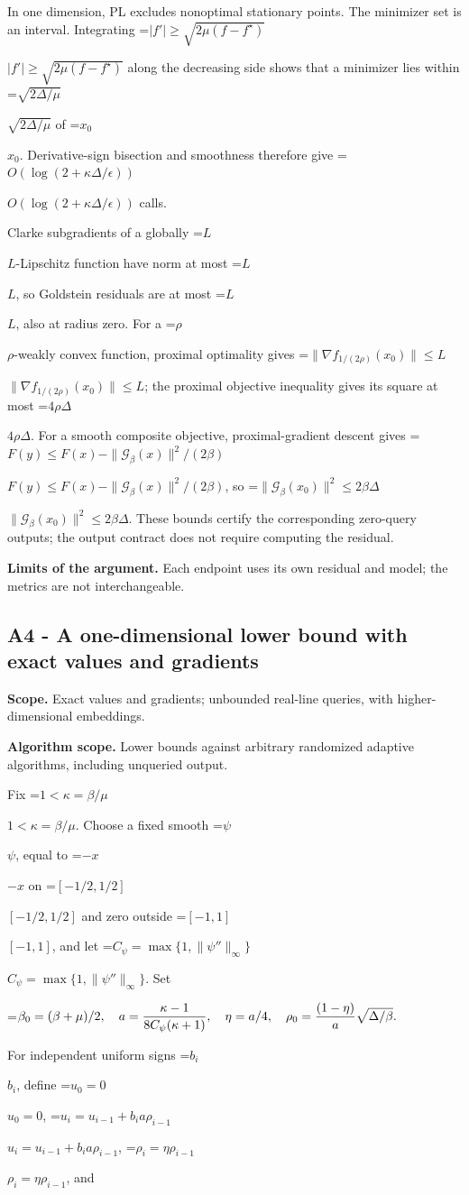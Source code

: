 \documentclass[10pt,a4paper]{article}
\newcommand{\AtlasMath}[1]{\par\begingroup\centering\setbox0=\hbox{$\displaystyle #1$}\ifdim\wd0>1.4\linewidth\typeout{ATLAS WIDE FORMULA: \the\wd0}\fi\ifdim\wd0>\linewidth\resizebox{\linewidth}{!}{\box0}\else\box0\fi\par\endgroup}
\newcommand{\AtlasInlineMath}[1]{\begingroup\setbox0=\hbox{$#1$}\ifdim\wd0>.4\linewidth\endgroup\AtlasMath{#1}\else\endgroup$#1$\fi}
\begin{document}
In one dimension, PL excludes nonoptimal stationary points. The minimizer set is an interval. Integrating
\AtlasInlineMath{|f'|\ge\sqrt{2\mu(f-f^\star)}}
along the decreasing side shows that a minimizer lies within \AtlasInlineMath{\sqrt{2\Delta/\mu}} of \AtlasInlineMath{x_0}. Derivative-sign bisection and smoothness therefore give \AtlasInlineMath{O(\log(2+\kappa\Delta/\epsilon))} calls.

Clarke subgradients of a globally \AtlasInlineMath{L}-Lipschitz function have norm at most \AtlasInlineMath{L}, so Goldstein residuals are at most \AtlasInlineMath{L}, also at radius zero. For a \AtlasInlineMath{\rho}-weakly convex function, proximal optimality gives
\AtlasInlineMath{\|\nabla f_{1/(2\rho)}(x_0)\|\le L}; the proximal objective inequality gives its square at most \AtlasInlineMath{4\rho\Delta}.
For a smooth composite objective, proximal-gradient descent gives
\AtlasInlineMath{F(y)\le F(x)-\|\mathcal G_\beta(x)\|^2/(2\beta)},
so \AtlasInlineMath{\|\mathcal G_\beta(x_0)\|^2\le2\beta\Delta}.
These bounds certify the corresponding zero-query outputs; the output contract does not require computing the residual.

\textbf{Limits of the argument.} Each endpoint uses its own residual and model; the metrics are not interchangeable.

\subsection{A4 - A one-dimensional lower bound with exact values and gradients}
\textbf{Scope.} Exact values and gradients; unbounded real-line queries, with higher-dimensional embeddings.

\textbf{Algorithm scope.} Lower bounds against arbitrary randomized adaptive algorithms, including unqueried output.

Fix \AtlasInlineMath{1<\kappa=\beta/\mu}. Choose a fixed smooth \AtlasInlineMath{\psi}, equal to \AtlasInlineMath{-x} on \AtlasInlineMath{[-1/2,1/2]} and zero outside \AtlasInlineMath{[-1,1]}, and let \AtlasInlineMath{C_\psi=\max\{1,\|\psi''\|_\infty\}}. Set

\AtlasMath{\beta_0=(\beta+\mu)/2,\quad a={\kappa-1\over8C_\psi(\kappa+1)},\quad
\eta=a/4,\quad \rho_0={(1-\eta)\over a}\sqrt{\Delta/\beta}.}

For independent uniform signs \AtlasInlineMath{b_i}, define \AtlasInlineMath{u_0=0},
\AtlasInlineMath{u_i=u_{i-1}+b_i a\rho_{i-1}}, \AtlasInlineMath{\rho_i=\eta\rho_{i-1}}, and
\end{document}
